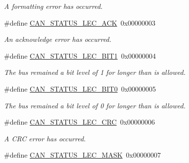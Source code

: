 \begin{DoxyCompactItemize}
\begin{DoxyCompactList}\small\item\em A formatting error has occurred. \end{DoxyCompactList}\item 
\#define \hyperlink{group__can__api_ga09678c99a5e937f8af5ec659f2a2ea44}{C\+A\+N\+\_\+\+S\+T\+A\+T\+U\+S\+\_\+\+L\+E\+C\+\_\+\+A\+CK}~0x00000003\hypertarget{group__can__api_ga09678c99a5e937f8af5ec659f2a2ea44}{}\label{group__can__api_ga09678c99a5e937f8af5ec659f2a2ea44}

\begin{DoxyCompactList}\small\item\em An acknowledge error has occurred. \end{DoxyCompactList}\item 
\#define \hyperlink{group__can__api_ga8a78754c15f75b6b422116055116e661}{C\+A\+N\+\_\+\+S\+T\+A\+T\+U\+S\+\_\+\+L\+E\+C\+\_\+\+B\+I\+T1}~0x00000004\hypertarget{group__can__api_ga8a78754c15f75b6b422116055116e661}{}\label{group__can__api_ga8a78754c15f75b6b422116055116e661}

\begin{DoxyCompactList}\small\item\em The bus remained a bit level of 1 for longer than is allowed. \end{DoxyCompactList}\item 
\#define \hyperlink{group__can__api_gadb270e9f4ea428522ec8cef106160729}{C\+A\+N\+\_\+\+S\+T\+A\+T\+U\+S\+\_\+\+L\+E\+C\+\_\+\+B\+I\+T0}~0x00000005\hypertarget{group__can__api_gadb270e9f4ea428522ec8cef106160729}{}\label{group__can__api_gadb270e9f4ea428522ec8cef106160729}

\begin{DoxyCompactList}\small\item\em The bus remained a bit level of 0 for longer than is allowed. \end{DoxyCompactList}\item 
\#define \hyperlink{group__can__api_ga8658d447348d87ecfd5c1386c48ee781}{C\+A\+N\+\_\+\+S\+T\+A\+T\+U\+S\+\_\+\+L\+E\+C\+\_\+\+C\+RC}~0x00000006\hypertarget{group__can__api_ga8658d447348d87ecfd5c1386c48ee781}{}\label{group__can__api_ga8658d447348d87ecfd5c1386c48ee781}

\begin{DoxyCompactList}\small\item\em A C\+RC error has occurred. \end{DoxyCompactList}\item 
\#define \hyperlink{group__can__api_gad5d011f8a4533a174f037e151a35cebe}{C\+A\+N\+\_\+\+S\+T\+A\+T\+U\+S\+\_\+\+L\+E\+C\+\_\+\+M\+A\+SK}~0x00000007\hypertarget{group__can__api_gad5d011f8a4533a174f037e151a35cebe}{}\label{group__can__api_gad5d011f8a4533a174f037e151a35cebe}


\end{DoxyCompactItemize}
